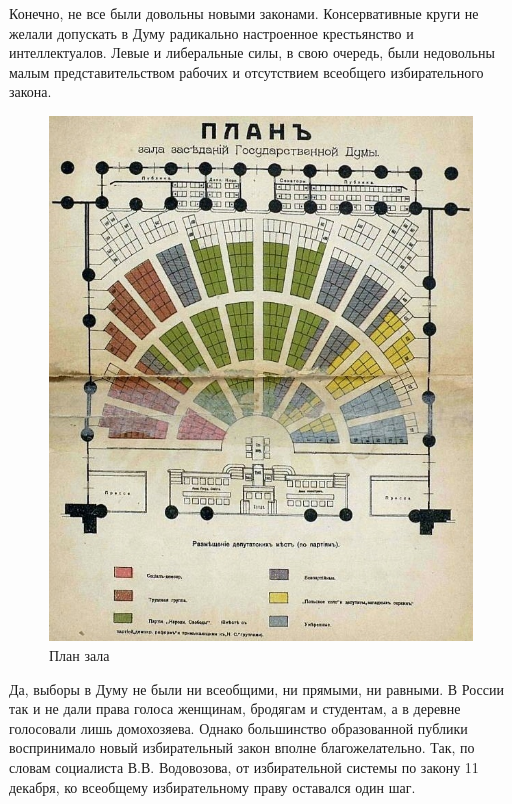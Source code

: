 Конечно, не все были довольны новыми законами. Консервативные круги не желали допускать в Думу радикально настроенное крестьянство и интеллектуалов. Левые и либеральные силы, в свою очередь, были недовольны малым представительством рабочих и отсутствием всеобщего избирательного закона.
\begin{figure}[h!tb] 
	\centering\includegraphics[scale=0.3]{Data/Vybory_V_Dumu/nXeg2HavApM.jpg}
	\caption{План зала}%
\end{figure}

Да, выборы в Думу не были ни всеобщими, ни прямыми, ни равными. В России так и не дали права голоса женщинам, бродягам и студентам, а в деревне голосовали лишь домохозяева. Однако большинство образованной публики воспринимало новый избирательный закон вполне благожелательно. Так, по словам социалиста В.В. Водовозова, от избирательной системы по закону 11 декабря, ко всеобщему избирательному праву оставался один шаг.

